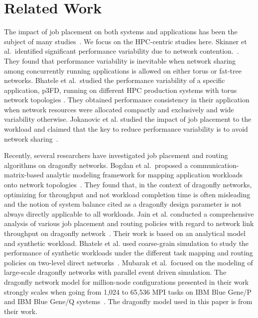 \section{Related Work}
\label{sec:related work}

The impact of job placement on both systems and applications has been the subject of many studies~\cite{dskinner,abhinav-sc13,jose-ipdps15}. We focus on the HPC-centric studies here. Skinner et al.\ identified significant performance variability due to network contention.~\cite{dskinner}. They found that performance variability is inevitable when network sharing among concurrently running applications is allowed on either torus or fat-tree networks.
Bhatele et al.\ studied the performance variability of a specific application, p3FD, running on different HPC production systems with torus network topologies \cite{abhinav-sc13}. They obtained performance consistency in their application when network resources were allocated compactly and exclusively and wide variability otherwise. Jokanovic et al. studied the impact of job placement to the workload and claimed that the key to reduce performance variability is to avoid network sharing~\cite{jose-ipdps15}. 

Recently, several researchers have investigated job placement and routing algorithms on dragonfly networks. Bogdan et al.\ proposed a communication-matrix-based analytic modeling framework for mapping application workloads onto network topologies~\cite{hoefler-hpdc14}. They found that, in the context of dragonfly networks, optimizing for throughput and not workload completion time is often misleading and the notion of system balance cited as a dragonfly design parameter is not always directly applicable to all workloads.
Jain et al. conducted a comprehensive analysis of various job placement and routing policies with regard to network link throughput on dragonfly network~\cite{jain-sc14}. Their work is based on an analytical model and synthetic workload. Bhatele et al. used coarse-grain simulation to study the performance of synthetic workloads under the different task mapping and routing policies on two-level direct networks~\cite{bhatele-sc11}. Mubarak et al.\ focused on  the modeling of large-scale dragonfly networks with parallel event driven simulation. The dragonfly network model for million-node configurations presented in their work strongly scales when going from 1,024 to 65,536 MPI tasks on IBM Blue Gene/P and IBM Blue Gene/Q systems~\cite{codes-dragonfly}. The dragonfly model used in this paper is from their work. 

